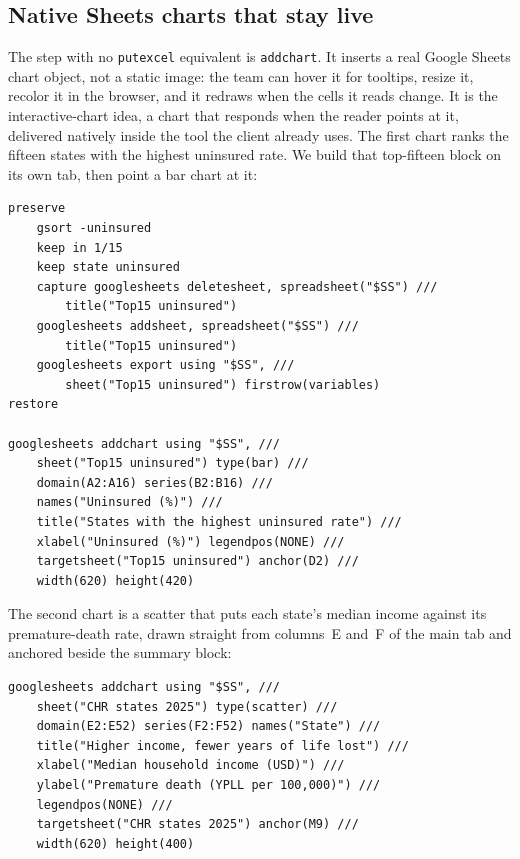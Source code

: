 \documentclass[
    a4paper,
    fontsize=10pt,
    twoside=true,
    numbers=noenddot,
]{kaobook}
\begin{document}
\subsection{Native Sheets charts that stay live}
The step with no \texttt{putexcel} equivalent is \texttt{addchart}. It inserts a real Google Sheets chart object, not a static image: the team can hover it for tooltips, resize it, recolor it in the browser, and it redraws when the cells it reads change. It is the interactive-chart idea, a chart that responds when the reader points at it, delivered natively inside the tool the client already uses. The first chart ranks the fifteen states with the highest uninsured rate. We build that top-fifteen block on its own tab, then point a bar chart at it:
\par
{\footnotesize
\begin{verbatim}
preserve
    gsort -uninsured
    keep in 1/15
    keep state uninsured
    capture googlesheets deletesheet, spreadsheet("$SS") ///
        title("Top15 uninsured")
    googlesheets addsheet, spreadsheet("$SS") ///
        title("Top15 uninsured")
    googlesheets export using "$SS", ///
        sheet("Top15 uninsured") firstrow(variables)
restore

googlesheets addchart using "$SS", ///
    sheet("Top15 uninsured") type(bar) ///
    domain(A2:A16) series(B2:B16) ///
    names("Uninsured (%)") ///
    title("States with the highest uninsured rate") ///
    xlabel("Uninsured (%)") legendpos(NONE) ///
    targetsheet("Top15 uninsured") anchor(D2) ///
    width(620) height(420)
\end{verbatim}
}
The second chart is a scatter that puts each state's median income against its premature-death rate, drawn straight from columns~E and~F of the main tab and anchored beside the summary block:
\par
{\footnotesize
\begin{verbatim}
googlesheets addchart using "$SS", ///
    sheet("CHR states 2025") type(scatter) ///
    domain(E2:E52) series(F2:F52) names("State") ///
    title("Higher income, fewer years of life lost") ///
    xlabel("Median household income (USD)") ///
    ylabel("Premature death (YPLL per 100,000)") ///
    legendpos(NONE) ///
    targetsheet("CHR states 2025") anchor(M9) ///
    width(620) height(400)
\end{verbatim}
}
\end{document}
